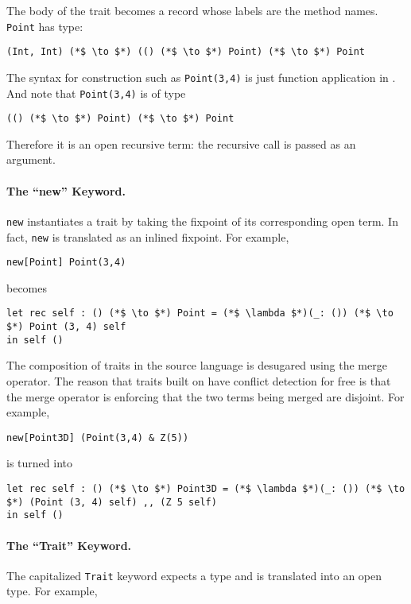 The body of the trait becomes a record whose labels are the method names.
\lstinline$Point$ has type:

\begin{lstlisting}
(Int, Int) (*$ \to $*) (() (*$ \to $*) Point) (*$ \to $*) Point
\end{lstlisting}

The syntax for construction such as \lstinline$Point(3,4)$ is just function
application in \name. And note that \lstinline$Point(3,4)$ is of type
\begin{lstlisting}
(() (*$ \to $*) Point) (*$ \to $*) Point
\end{lstlisting}

Therefore it is an open recursive term: the recursive call is passed as an argument.

\paragraph{The ``new'' Keyword.} \lstinline$new$ instantiates a trait by taking the
fixpoint of its corresponding open term. In fact, \lstinline$new$ is translated as
an inlined fixpoint. For example,

\begin{lstlisting}
new[Point] Point(3,4)
\end{lstlisting}

\noindent becomes

\begin{lstlisting}
let rec self : () (*$ \to $*) Point = (*$ \lambda $*)(_: ()) (*$ \to $*) Point (3, 4) self
in self ()
\end{lstlisting}

The composition of traits in the source language is desugared using the merge
operator. The reason that traits built on \name have conflict detection for free
is that the merge operator is enforcing that the two terms being merged are
disjoint. For example,

\begin{lstlisting}
new[Point3D] (Point(3,4) & Z(5))
\end{lstlisting}

\noindent is turned into

\begin{lstlisting}
let rec self : () (*$ \to $*) Point3D = (*$ \lambda $*)(_: ()) (*$ \to $*) (Point (3, 4) self) ,, (Z 5 self)
in self ()
\end{lstlisting}

\paragraph{The ``Trait'' Keyword.} The capitalized \lstinline$Trait$ keyword
expects a type and is translated into an open type. For example,

